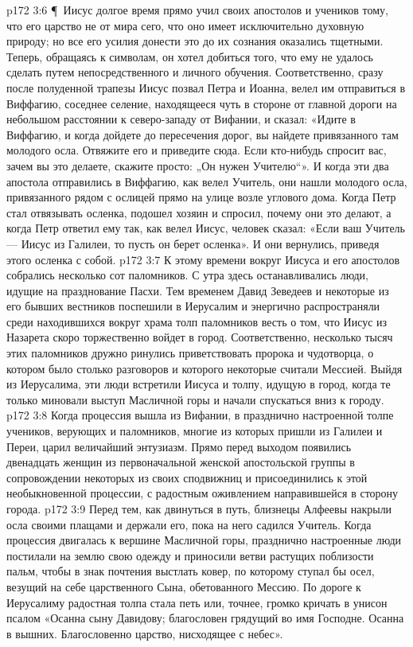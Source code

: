 \vs p172 3:6 \P\ Иисус долгое время прямо учил своих апостолов и учеников тому, что его царство не от мира сего, что оно имеет исключительно духовную природу; но все его усилия донести это до их сознания оказались тщетными. Теперь, обращаясь к символам, он хотел добиться того, что ему не удалось сделать путем непосредственного и личного обучения. Соответственно, сразу после полуденной трапезы Иисус позвал Петра и Иоанна, велел им отправиться в Виффагию, соседнее селение, находящееся чуть в стороне от главной дороги на небольшом расстоянии к северо\hyp{}западу от Вифании, и сказал: «Идите в Виффагию, и когда дойдете до пересечения дорог, вы найдете привязанного там молодого осла. Отвяжите его и приведите сюда. Если кто\hyp{}нибудь спросит вас, зачем вы это делаете, скажите просто: „Он нужен Учителю“». И когда эти два апостола отправились в Виффагию, как велел Учитель, они нашли молодого осла, привязанного рядом с ослицей прямо на улице возле углового дома. Когда Петр стал отвязывать осленка, подошел хозяин и спросил, почему они это делают, а когда Петр ответил ему так, как велел Иисус, человек сказал: «Если ваш Учитель --- Иисус из Галилеи, то пусть он берет осленка». И они вернулись, приведя этого осленка с собой.
\vs p172 3:7 К этому времени вокруг Иисуса и его апостолов собрались несколько сот паломников. С утра здесь останавливались люди, идущие на празднование Пасхи. Тем временем Давид Зеведеев и некоторые из его бывших вестников поспешили в Иерусалим и энергично распространяли среди находившихся вокруг храма толп паломников весть о том, что Иисус из Назарета скоро торжественно войдет в город. Соответственно, несколько тысяч этих паломников дружно ринулись приветствовать пророка и чудотворца, о котором было столько разговоров и которого некоторые считали Мессией. Выйдя из Иерусалима, эти люди встретили Иисуса и толпу, идущую в город, когда те только миновали выступ Масличной горы и начали спускаться вниз к городу.
\vs p172 3:8 Когда процессия вышла из Вифании, в празднично настроенной толпе учеников, верующих и паломников, многие из которых пришли из Галилеи и Переи, царил величайший энтузиазм. Прямо перед выходом появились двенадцать женщин из первоначальной женской апостольской группы в сопровождении некоторых из своих сподвижниц и присоединились к этой необыкновенной процессии, с радостным оживлением направившейся в сторону города.
\vs p172 3:9 Перед тем, как двинуться в путь, близнецы Алфеевы накрыли осла своими плащами и держали его, пока на него садился Учитель. Когда процессия двигалась к вершине Масличной горы, празднично настроенные люди постилали на землю свою одежду и приносили ветви растущих поблизости пальм, чтобы в знак почтения выстлать ковер, по которому ступал бы осел, везущий на себе царственного Сына, обетованного Мессию. По дороге к Иерусалиму радостная толпа стала петь или, точнее, громко кричать в унисон псалом «Осанна сыну Давидову; благословен грядущий во имя Господне. Осанна в вышних. Благословенно царство, нисходящее с небес».
